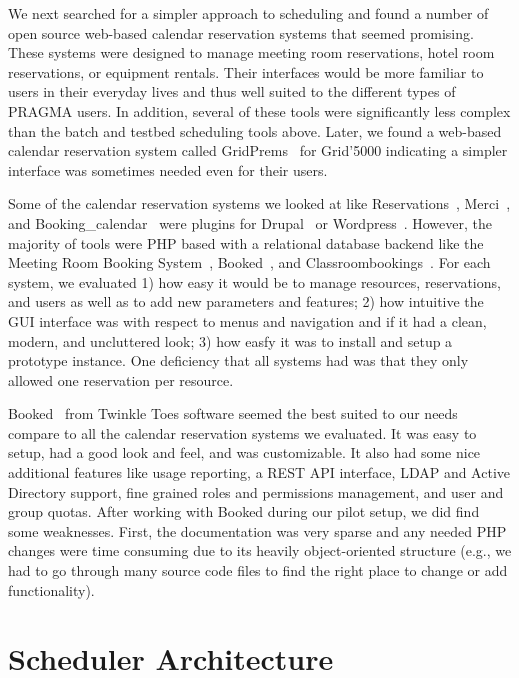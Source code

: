 \documentclass{acm_proc_article-sp}
\begin{document}
We next searched for a simpler approach to scheduling and found a number of open source web-based calendar reservation systems that seemed promising.  These systems were designed to manage meeting room reservations, hotel room reservations, or equipment rentals.   Their interfaces would be more familiar to users in their everyday lives and thus well suited to the different types of PRAGMA users.  In addition, several of these tools were significantly less complex than the batch and testbed scheduling tools above.  Later, we found a web-based calendar reservation system called GridPrems~\cite{gridprems} for Grid'5000 indicating a simpler interface was sometimes needed even for their users.

Some of the calendar reservation systems we looked at like Reservations~\cite{drupalreservations}, Merci~\cite{merci}, and Booking\_calendar~\cite{wordpressbooking} were plugins for Drupal~\cite{drupal} or Wordpress~\cite{wordpress}.  However, the majority of tools were PHP based with a relational database backend like the Meeting Room Booking System~\cite{mrbs}, Booked~\cite{booked}, and Classroombookings~\cite{classroombookings}.  For each system, we evaluated 1) how easy it would be to manage resources, reservations, and users as well as to add new parameters and features; 2) how intuitive the GUI interface was with respect to menus and navigation and if it had a clean, modern, and uncluttered look; 3)  how easfy it was to install and setup a prototype instance. One deficiency that all systems had was that they only allowed one reservation per resource.

Booked~\cite{booked} from Twinkle Toes software seemed the best suited to our needs compare to all the calendar reservation systems we evaluated.  It was easy to setup, had  a good look and feel, and was customizable.  It also had some nice additional features like usage reporting, a REST API interface, LDAP and Active Directory support, fine grained roles and permissions management, and user and group quotas.  After working with Booked during our pilot setup, we did find some weaknesses.  First, the documentation was very sparse and any needed PHP changes were time consuming due to its heavily object-oriented structure (e.g., we had to go through many source code files to find the right place to change  or add functionality). 


\section{Scheduler Architecture}
\label{Sec:Arch}
\end{document}

